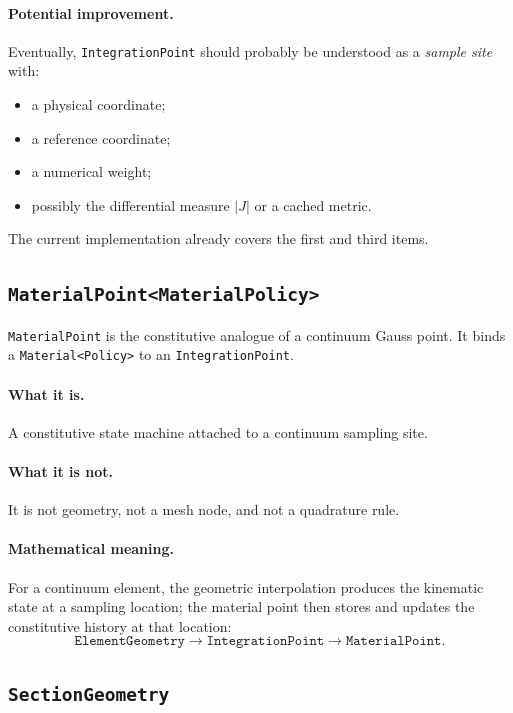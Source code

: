 \paragraph{Potential improvement.}
Eventually, \texttt{IntegrationPoint} should probably be understood as a
\emph{sample site} with:

\begin{itemize}[nosep]
  \item a physical coordinate;
  \item a reference coordinate;
  \item a numerical weight;
  \item possibly the differential measure \(|J|\) or a cached metric.
\end{itemize}

The current implementation already covers the first and third items.


\subsection{\texttt{MaterialPoint<MaterialPolicy>}}

\texttt{MaterialPoint} is the constitutive analogue of a continuum Gauss point.
It binds a \texttt{Material<Policy>} to an \texttt{IntegrationPoint}.

\paragraph{What it is.}
A constitutive state machine attached to a continuum sampling site.

\paragraph{What it is not.}
It is not geometry, not a mesh node, and not a quadrature rule.

\paragraph{Mathematical meaning.}
For a continuum element, the geometric interpolation produces the kinematic
state at a sampling location; the material point then stores and updates the
constitutive history at that location:
\[
\texttt{ElementGeometry} \longrightarrow \texttt{IntegrationPoint}
\longrightarrow \texttt{MaterialPoint}.
\]


\subsection{\texttt{SectionGeometry}}

